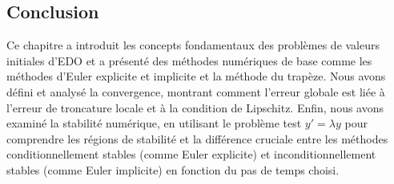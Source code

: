 \documentclass{article}
\begin{document}
\subsection*{Conclusion}

Ce chapitre a introduit les concepts fondamentaux des problèmes de valeurs initiales d'EDO et a présenté des méthodes numériques de base comme les méthodes d'Euler explicite et implicite et la méthode du trapèze. Nous avons défini et analysé la convergence, montrant comment l'erreur globale est liée à l'erreur de troncature locale et à la condition de Lipschitz. Enfin, nous avons examiné la stabilité numérique, en utilisant le problème test $y'=\lambda y$ pour comprendre les régions de stabilité et la différence cruciale entre les méthodes conditionnellement stables (comme Euler explicite) et inconditionnellement stables (comme Euler implicite) en fonction du pas de temps choisi.
\end{document}
